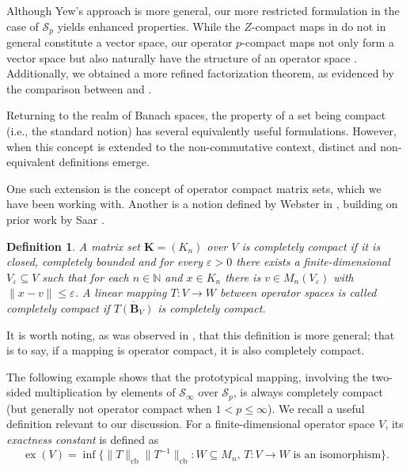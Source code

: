 \documentclass[11pt]{amsart}
\DeclareMathOperator{\cb}{cb}
\DeclareMathOperator{\ex}{ex}
\newcommand{\N}{{\mathbb{N}}}
\newtheorem{definition}[theorem]{Definition}
\numberwithin{equation}{section}
\begin{document}
Although Yew's approach is more general, our more restricted formulation in the case of $\mathcal{S}_p$ yields enhanced properties. While the  $Z$-compact maps in \cite{Yew} do not in general constitute a vector space, our operator $p$-compact maps not only form a vector space but also naturally have the structure of an operator space \cite{ChaDiGa-Operator-p-compact}. Additionally, we obtained a more refined factorization theorem, as evidenced by the comparison between \cite[Thm. 3.9]{Yew} and \cite[Prop. 3.8]{ChaDiGa-Operator-p-compact}.



Returning to the realm of Banach spaces, the property of a set being compact (i.e., the standard notion) has several equivalently useful formulations. However, when this concept is extended to the non-commutative context, distinct and non-equivalent definitions emerge.

One such extension is the concept of operator compact matrix sets, which we have been working with. Another is a notion defined by Webster in \cite[Def. 4.1.2]{Webster}, building on prior work by Saar \cite{Saar}.

\begin{definition}
    A matrix set $\mathbf{K}=(K_n)$ over $V$ is \emph{ completely compact} if it is closed, completely bounded  and for every $\varepsilon>0$ there exists a finite-dimensional $V_\varepsilon \subseteq V$ such that for each $n\in\N$ and $x\in K_n$ there is  $v\in M_n(V_\varepsilon) $ with $\|x-v\|\le \varepsilon$.
    A linear mapping $T : V \to W$ between operator spaces is called \emph{completely compact} if $\overline{T(\mathbf{B}_V)}$ is completely compact.
\end{definition}

 It is worth noting, as was observed in \cite{Webster}, that this definition is more general; that is to say, if a mapping is operator compact, it is also completely  compact.

The following  example shows that the prototypical mapping, involving the two-sided multiplication by elements of $\mathcal{S}_{\infty}$ over $\mathcal{S}_p$, is always completely compact (but generally not operator compact when $1< p \le \infty$).  
We recall a useful definition relevant to our discussion. For a finite-dimensional operator space $V$, its \emph{exactness constant} is defined as  
\[
\ex(V) = \inf \big\{ \|T\|_{\cb} \|T^{-1}\|_{\cb} : W \subseteq M_n, \, T : V \to W \text{ is an isomorphism} \big\}.
\]  
\end{document}
